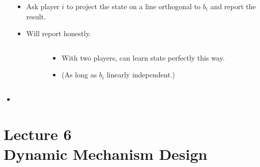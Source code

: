 \documentclass[english,handout,10pt]{beamer}		%
\def\lyxframeend{} %
\begin{document}
\begin{columns}
	\begin{column}{0.55\textwidth}
		\begin{center}
			
		\end{center}
	\end{column}
	\begin{column}{0.4\textwidth}
		{\small
			\begin{itemize}
				\item Ask player $i$ to project the state on a line orthogonal to $b_i$ and report the result.
				\item Will report honestly.
			\end{itemize}
		}
	\end{column}
\end{columns}
\lyxframeend


\begin{columns}
	\begin{column}{0.55\textwidth}
		\begin{center}
			
		\end{center}
	\end{column}
	\begin{column}{0.4\textwidth}
		{\small
			\begin{itemize}
				\item With two players, can learn state perfectly this way.
				\item (As long as $b_i$ linearly independent.)
			\end{itemize}
		}
	\end{column}
\end{columns}
\lyxframeend




\begin{itemize}
	\item 
\end{itemize}
\lyxframeend




\section{Lecture 6 \\ Dynamic Mechanism Design}
\end{document}
